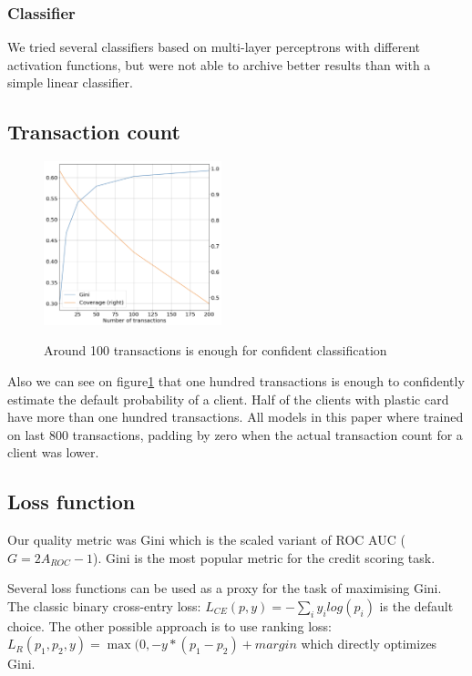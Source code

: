 \documentclass{sigkddExp}
\begin{document}
\subsubsection{Classifier}

We tried several classifiers based on multi-layer perceptrons with different activation functions, but were not able to archive better results than with a simple linear classifier.

\subsection{Transaction count}

\begin{figure}
  \caption{Around 100 transactions is enough for confident classification}
  \includegraphics[width=0.46\textwidth]{information-vs-accuracy.png}
  \label{fig2}
\end{figure}

Also we can see on figure\ref{fig2} that one hundred transactions is enough to confidently estimate the default probability of a client. Half of the clients with plastic card have more than one hundred transactions. All models in this paper where trained on last 800 transactions, padding by zero when the actual transaction count for a client was lower.

\subsection{Loss function}

Our quality metric was Gini which is the scaled variant of ROC AUC ($G = 2A_{ROC} - 1$). Gini is the most popular metric for the credit scoring task.

Several loss functions can be used as a proxy for the task of maximising Gini. The classic binary cross-entry loss: $L_{CE}(p, y) = - \sum_i y_ilog(p_i)$ is the default choice.
The other possible approach is to use ranking loss: $ L_R(p_1, p_2, y) = \max(0, -y * (p_1 - p_2) + margin $ which directly optimizes Gini.
\end{document}
